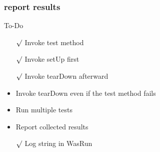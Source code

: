 \documentclass[lualatex]{beamer}
\begin{document}
\begin{frame}
  \frametitle{report results}

  \begin{block}{To-Do}
    \begin{itemize}
    \item[$\surd$] Invoke test method
    \item[$\surd$] Invoke setUp first 
    \item[$\surd$] Invoke tearDown afterward 
    \item Invoke tearDown even if the test method fails 
    \item Run multiple tests 
    \item Report collected results 
    \item[$\surd$] Log string in WasRun 
    \end{itemize}
  \end{block}
\end{frame}
\end{document}
